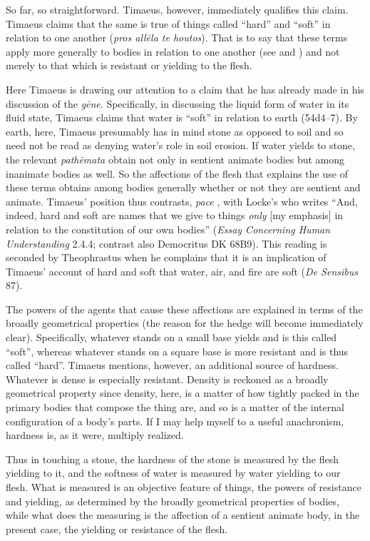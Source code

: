 So far, so straightforward. Timaeus, however, immediately qualifies this claim. Timaeus claims that the same is true of things called ``hard'' and ``soft'' in relation to one another (\emph{pros allēla te houtos}). That is to say that these terms apply more generally to bodies in relation to one another (see \citealt[228, n6]{Archer-Hind:1888qd} and \citealt[110]{OBrien:1984ji}) and not merely to that which is resistant or yielding to the flesh.

Here Timaeus is drawing our attention to a claim that he has already made in his discussion of the \emph{gēne}. Specifically, in discussing the liquid form of water in its fluid state, Timaeus claims that water is ``soft'' in relation to earth (54d4--7). By earth, here, Timaeus presumably has in mind stone as opposed to soil and so need not be read as denying water's role in soil erosion. If water yields to stone, the relevant \emph{pathēmata} obtain not only in sentient animate bodies but among inanimate bodies as well. So the affections of the flesh that explains the use of these terms obtains among bodies generally whether or not they are sentient and animate. Timaeus' position thus contrasts, \emph{pace} \citet[185, n2]{Beare:1906uq}, with Locke's who writes ``And, indeed, hard and soft are names that we give to things \emph{only} [my emphasis] in relation to the constitution of our own bodies'' (\emph{Essay Concerning Human Understanding} 2.4.4; contrast also Democritus DK 68B9). This reading is seconded by Theophrastus when he complains that it is an implication of Timaeus' account of hard and soft that water, air, and fire are soft (\emph{De Sensibus} 87).

The powers of the agents that cause these affections are explained in terms of the broadly geometrical properties (the reason for the hedge will become immediately clear). Specifically, whatever stands on a small base yields and is this called ``soft'', whereas whatever stands on a square base is more resistant and is thus called ``hard''. Timaeus mentions, however, an additional source of hardness. Whatever is dense is especially resistant. Density is reckoned as a broadly geometrical property since density, here, is a matter of how tightly packed in the primary bodies that compose the thing are, and so is a matter of the internal configuration of a body's parts. If I may help myself to a useful anachronism, hardness is, as it were, multiply realized.

Thus in touching a stone, the hardness of the stone is measured by the flesh yielding to it, and the softness of water is measured by water yielding to our flesh. What is measured is an objective feature of things, the powers of resistance and yielding, as determined by the broadly geometrical properties of bodies, while what does the measuring is the affection of a sentient animate body, in the present case, the yielding or resistance of the flesh.

